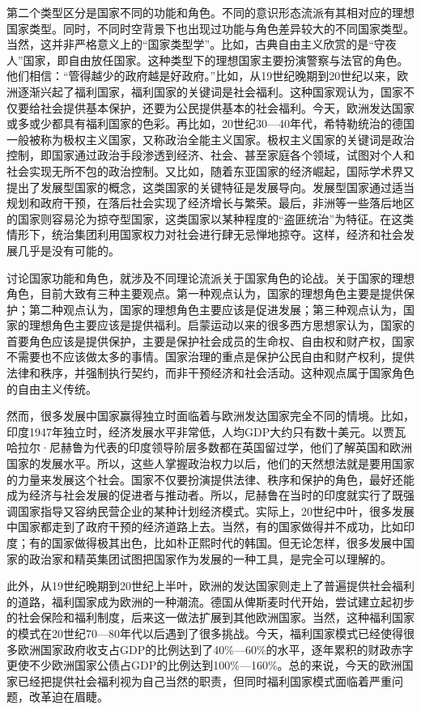 第二个类型区分是国家不同的功能和角色。不同的意识形态流派有其相对应的理想国家类型。同时，不同时空背景下也出现过功能与角色差异较大的不同国家类型。当然，这并非严格意义上的“国家类型学”。比如，古典自由主义欣赏的是“守夜人”国家，即自由放任国家。这种类型下的理想国家主要扮演警察与法官的角色。他们相信：“管得越少的政府越是好政府。”比如，从19世纪晚期到20世纪以来，欧洲逐渐兴起了福利国家，福利国家的关键词是社会福利。这种国家观认为，国家不仅要给社会提供基本保护，还要为公民提供基本的社会福利。今天，欧洲发达国家或多或少都具有福利国家的色彩。再比如，20世纪30—40年代，希特勒统治的德国一般被称为极权主义国家，又称政治全能主义国家。极权主义国家的关键词是政治控制，即国家通过政治手段渗透到经济、社会、甚至家庭各个领域，试图对个人和社会实现无所不包的政治控制。又比如，随着东亚国家的经济崛起，国际学术界又提出了发展型国家的概念，这类国家的关键特征是发展导向。发展型国家通过适当规划和政府干预，在落后社会实现了经济增长与繁荣。最后，非洲等一些落后地区的国家则容易沦为掠夺型国家，这类国家以某种程度的“盗匪统治”为特征。在这类情形下，统治集团利用国家权力对社会进行肆无忌惮地掠夺。这样，经济和社会发展几乎是没有可能的。

讨论国家功能和角色，就涉及不同理论流派关于国家角色的论战。关于国家的理想角色，目前大致有三种主要观点。第一种观点认为，国家的理想角色主要是提供保护；第二种观点认为，国家的理想角色主要应该是促进发展；第三种观点认为，国家的理想角色主要应该是提供福利。启蒙运动以来的很多西方思想家认为，国家的首要角色应该是提供保护，主要是保护社会成员的生命权、自由权和财产权，国家不需要也不应该做太多的事情。国家治理的重点是保护公民自由和财产权利，提供法律和秩序，并强制执行契约，而非干预经济和社会活动。这种观点属于国家角色的自由主义传统。

然而，很多发展中国家赢得独立时面临着与欧洲发达国家完全不同的情境。比如，印度1947年独立时，经济发展水平非常低，人均GDP大约只有数十美元。以贾瓦哈拉尔·尼赫鲁为代表的印度领导阶层多数都在英国留过学，他们了解英国和欧洲国家的发展水平。所以，这些人掌握政治权力以后，他们的天然想法就是要用国家的力量来发展这个社会。国家不仅要扮演提供法律、秩序和保护的角色，最好还能成为经济与社会发展的促进者与推动者。所以，尼赫鲁在当时的印度就实行了既强调国家指导又容纳民营企业的某种计划经济模式。实际上，20世纪中叶，很多发展中国家都走到了政府干预的经济道路上去。当然，有的国家做得并不成功，比如印度；有的国家做得极其出色，比如朴正熙时代的韩国。但无论怎样，很多发展中国家的政治家和精英集团试图把国家作为发展的一种工具，是完全可以理解的。

此外，从19世纪晚期到20世纪上半叶，欧洲的发达国家则走上了普遍提供社会福利的道路，福利国家成为欧洲的一种潮流。德国从俾斯麦时代开始，尝试建立起初步的社会保险和福利制度，后来这一做法扩展到其他欧洲国家。当然，这种福利国家的模式在20世纪70—80年代以后遇到了很多挑战。今天，福利国家模式已经使得很多欧洲国家政府收支占GDP的比例达到了40\%—60\%的水平，逐年累积的财政赤字更使不少欧洲国家公债占GDP的比例达到100\%—160\%。总的来说，今天的欧洲国家已经把提供社会福利视为自己当然的职责，但同时福利国家模式面临着严重问题，改革迫在眉睫。

